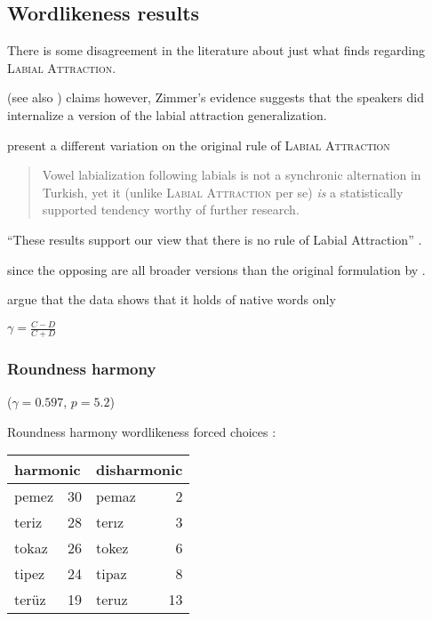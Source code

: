 \subsection{Wordlikeness results}

There is some disagreement in the literature about just what \citet{Zimmer1969} finds regarding \textsc{Labial Attraction}.

\citet{Zimmer1969}
(see also \citet[][4]{Zuraw2000})
claims however, Zimmer's evidence suggests that the speakers did internalize a version of the labial attraction generalization.

\citet{Inkelas2001} present a different variation on the original rule of \textsc{Labial Attraction}

\begin{quotation}
Vowel labialization following labials is not a synchronic alternation in Turkish, yet it (unlike \textsc{Labial Attraction} per se) \emph{is} a statistically supported tendency worthy of further research. \citep[][196, emphasis in original]{Inkelas2001}
\end{quotation}

``These results support our view that there is no rule of Labial Attraction'' \citep[][225]{Clements1982}.

since the opposing are all broader versions than the original formulation by \citeauthor{Lees1966a}.

\citet{Ito1993} argue that the data shows that it holds of native words only

\citet{Goodman1954}

\ex $\displaystyle \gamma = \frac{C - D}{C + D}$ \xe

\subsubsection{Roundness harmony}

($\gamma = 0.597$, $p = 5.2$) 

Roundness harmony wordlikeness forced choices \citep[314]{Zimmer1969}: \vspace{6pt} \\ 
\begin{tabular}{l r l r}
\toprule
\multicolumn{2}{l}{harmonic} & \multicolumn{2}{l}{disharmonic} \\
\midrule
pemez & 30                   & pemaz & 2 \\
teriz & 28                   & terız & 3 \\
tokaz & 26                   & tokez & 6 \\
tipez & 24                   & tipaz & 8 \\
terüz & 19                   & teruz & 13 \\
\bottomrule
\end{tabular}

